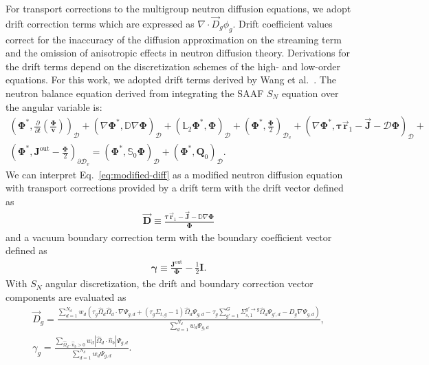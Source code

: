 \documentclass[letterpaper]{mc2025}
\begin{document}
For transport corrections to the multigroup neutron diffusion equations, we adopt drift correction
terms which are expressed as $\nabla\cdot \vec{D}_g\phi_g$. Drift
coefficient values correct for the inaccuracy of the diffusion approximation on the streaming term
and the omission of anisotropic effects in neutron diffusion theory.
Derivations for the drift terms depend on the discretization schemes of the high- and low-order
equations. For this work, we adopted drift terms derived by Wang et al.\
\cite{wang_diffusion_2014}. The neutron balance equation derived from
integrating the \gls*{SAAF} $S_N$ equation over the angular variable is:
%
\begin{multline}
  \left(\bm{\Phi}^*,\frac{\partial}{\partial t}\left(\frac{\bm{\Phi}}{\bm{v}}\right)\right)_\mathcal{D}
  + \left(\nabla\bm{\Phi}^*, \mathbb{D}\nabla\bm{\Phi}\right)_\mathcal{D}
  + \left(\mathbb{L}_2\bm{\Phi}^*,\bm{\Phi}\right)_\mathcal{D}
  + \left(\bm{\Phi}^*,\frac{\bm{\Phi}}{2}\right)_{\mathcal{D}_v}
  + \left(\nabla\bm{\Phi}^*,\bm{\tau}\vec{\bm{r}}_1-\vec{\bm{J}}-\mathcal{D}\bm{\Phi}\right)_\mathcal{D}
  + \\
  \left(\bm{\Phi}^*,\bm{J}^\text{out}-\frac{\bm{\Phi}}{2}\right)_{\partial\mathcal{D}_v}
  = \left(\bm{\Phi}^*,\mathbb{S}_0\bm{\Phi}\right)_\mathcal{D}
  + \left(\bm{\Phi}^*,\bm{Q}_0\right)_\mathcal{D}. \label{eq:modified-diff}
\end{multline}
%
We can interpret Eq.\ \ref{eq:modified-diff} as a modified neutron diffusion equation with
transport corrections provided by a drift term with the drift vector defined as
%
\begin{gather}
  \vec{\bm{D}} \equiv \frac{\bm{\tau}\vec{\bm{r}}_1-\vec{\bm{J}}-\mathbb{D}\nabla\bm{\Phi}}{\bm{\Phi}}
\end{gather}
%
and a vacuum boundary correction term with the boundary coefficient vector defined as
%
\begin{gather}
  \bm{\gamma} \equiv \frac{\bm{J}^\text{out}}{\bm{\Phi}}-\frac{1}{2}\bm{I}.
\end{gather}
%
With $S_N$ angular discretization, the drift and boundary correction vector components are
evaluated as
%
\begin{gather}
  \vec{D}_g = \frac{\sum^{N_d}_{d=1}w_d\left(\tau_g\hat{\Omega}_d\hat{\Omega}_d\cdot\nabla\Psi_{g,d}
  + \left(\tau_g\Sigma_{t,g}-1\right)\hat{\Omega}_d\Psi_{g,d}
  - \tau_g\sum^G_{g'=1}\Sigma^{g'\rightarrow g}_{s,1}\hat{\Omega}_d\Psi_{g',d}
  - D_g\nabla\Psi_{g,d}\right)}{\sum^{N_d}_{d=1}w_d\Psi_{g,d}}, \label{eq:drift} \\
  \gamma_g =
  \frac{\sum_{\hat{\Omega}_d\cdot\hat{n}_b > 0}w_d |\hat{\Omega}_d\cdot\hat{n}_b |
  \Psi_{g,d}}{\sum^{N_d}_{d=1}w_d\Psi_{g,d}}. \label{eq:bound-coef}
\end{gather}
\end{document}
